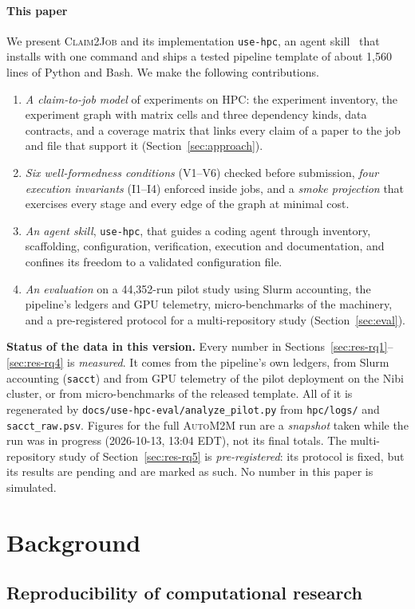 \documentclass[pdflatex,sn-mathphys-num]{sn-jnl}
\theoremstyle{thmstyleone}%
\theoremstyle{thmstyletwo}%
\theoremstyle{thmstylethree}%
\newcommand{\cj}{\textsc{Claim2Job}}
\newcommand{\skill}{\texttt{use-hpc}}
\newcommand{\auto}{\textsc{AutoM2M}}
\newcommand{\code}[1]{\texttt{#1}}
\newcommand{\V}[1]{\textsf{V#1}}
\newcommand{\I}[1]{\textsf{I#1}}
\newcommand{\DataStatus}{%
\begin{tcolorbox}[enhanced, breakable, colback=rawbg, colframe=rawbar, boxrule=0.6pt, arc=1pt,
  left=6pt, right=6pt, top=4pt, bottom=4pt]
\small\textbf{Status of the data in this version.} Every number in
Sections~\ref{sec:res-rq1}--\ref{sec:res-rq4} is \emph{measured}. It comes from
the pipeline's own ledgers, from Slurm accounting (\code{sacct}) and from GPU
telemetry of the pilot deployment on the Nibi cluster, or from micro-benchmarks
of the released template. All of it is regenerated by
\code{docs/use-hpc-eval/analyze\_pilot.py} from \code{hpc/logs/} and
\code{sacct\_raw.psv}. Figures for the full \auto{} run are a \emph{snapshot}
taken while the run was in progress (2026-10-13, 13:04 EDT), not its final
totals. The multi-repository study of Section~\ref{sec:res-rq5} is
\emph{pre-registered}: its protocol is fixed, but its results are pending and
are marked as such. No number in this paper is simulated.
\end{tcolorbox}}
\begin{document}
\paragraph{This paper} We present \cj{} and its implementation \skill{}, an
agent skill~\cite{anthropic2025skills} that installs with one command and ships
a tested pipeline template of about 1{,}560 lines of Python and Bash. We make
the following contributions.
\begin{enumerate}[label=\textbf{C\arabic*}, leftmargin=2.2em, itemsep=1pt]
\item \emph{A claim-to-job model} of experiments on HPC: the experiment
inventory, the experiment graph with matrix cells and three dependency kinds,
data contracts, and a coverage matrix that links every claim of a paper to the
job and file that support it (Section~\ref{sec:approach}).
\item \emph{Six well-formedness conditions} (\V{1}--\V{6}) checked before
submission, \emph{four execution invariants} (\I{1}--\I{4}) enforced inside
jobs, and a \emph{smoke projection} that exercises every stage and every edge
of the graph at minimal cost.
\item \emph{An agent skill}, \skill{}, that guides a coding agent through
inventory, scaffolding, configuration, verification, execution and
documentation, and confines its freedom to a validated configuration file.
\item \emph{An evaluation} on a 44{,}352-run pilot study using Slurm
accounting, the pipeline's ledgers and GPU telemetry, micro-benchmarks of the
machinery, and a pre-registered protocol for a multi-repository study
(Section~\ref{sec:eval}).
\end{enumerate}

\DataStatus

\section{Background}\label{sec:background}

\subsection{Reproducibility of computational research}\label{sec:bg-repro}
\end{document}
